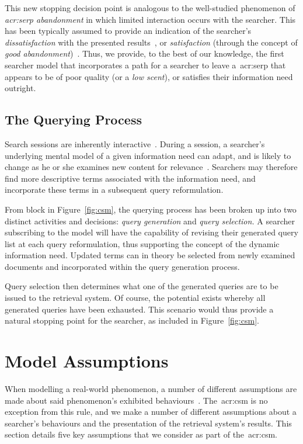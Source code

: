 This new stopping decision point is analogous to the well-studied phenomenon of \emph{\gls{acr:serp} abandonment} in which limited interaction occurs with the searcher. This has been typically assumed to provide an indication of the searcher's \emph{dissatisfaction} with the presented results~\citep{dassarma2008serp_abandonment, chuklin2012serp_abandonment, kiseleva2015serp_fails}, or \emph{satisfaction} (through the concept of \emph{good abandonment})~\cite{loumakis2011image_smells, wu2014information_scent}. Thus, we provide, to the best of our knowledge, the first searcher model that incorporates a path for a searcher to leave a~\gls{acr:serp} that appears to be of poor quality (or a \emph{low scent}), or satisfies their information need outright.

\subsection{The Querying Process}\label{sec:csm:advancements:querying}
Search sessions are inherently interactive~\citep{ingwersen2005theturn}. During a session, a searcher's underlying mental model of a given information need can adapt, and is likely to change as he or she examines new content for relevance~\citep{borlund2003iir_model}. Searchers may therefore find more descriptive terms associated with the information need, and incorporate these terms in a subsequent query reformulation.

From block  in Figure~\ref{fig:csm}, the querying process has been broken up into two distinct activities and decisions: \emph{query generation} and \emph{query selection.} A searcher subscribing to the model will have the capability of revising their generated query list at each query reformulation, thus supporting the concept of the dynamic information need. Updated terms can in theory be selected from newly examined documents and incorporated within the query generation process.

Query selection then determines what one of the generated queries are to be issued to the retrieval system. Of course, the potential exists whereby all generated queries have been exhausted. This scenario would thus provide a natural stopping point for the searcher, as included in Figure~\ref{fig:csm}.

\section{Model Assumptions}\label{sec:csm:assumptions}
When modelling a real-world phenomenon, a number of different assumptions are made about said phenomenon's exhibited behaviours~\cite{fishwick1995simulation}. The~\gls{acr:csm} is no exception from this rule, and we make a number of different assumptions about a searcher's behaviours and the presentation of the retrieval system's results. This section details five key assumptions that we consider as part of the~\gls{acr:csm}.

